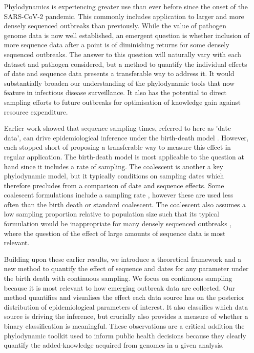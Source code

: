 \documentclass{article}
\begin{document}
Phylodynamics is experiencing greater use than ever before since the onset of the SARS-CoV-2 pandemic. This commonly includes application to larger and more densely sequenced outbreaks than previously. While the value of pathogen genome data is now well established, an emergent question is whether inclusion of more sequence data after a point is of diminishing returns for some densely sequenced outbreaks. The answer to this question will  naturally vary with each dataset and pathogen considered, but a method to quantify the individual effects of date and sequence data presents a transferable way to address it. It would substantially broaden our understanding of the phylodynamic tools that now feature in infectious disease surveillance. It also has the potential to direct sampling efforts to future outbreaks for optimisation of knowledge gain against resource expenditure. 

Earlier work showed that sequence sampling times, referred to here as 'date data', can drive epidemiological inference under the birth-death model \citep{volz_sampling_2014, boskova2018influence, Featherstone2021Infectious}. However, each stopped short of proposing a transferable way to measure this effect in regular application. The birth-death model is most applicable to the question at hand since it includes a rate of sampling. The coalescent is another a key phylodynamic model, but it typically conditions on sampling dates which therefore precludes from a comparison of date and sequence effects. Some coalescent formulations include a sampling rate \citep{volz_sampling_2014}, however these are used less often than the birth death or standard coalescent. The coalescent also assumes a low sampling proportion relative to population size such that its typical formulation would be inappropriate for many densely sequenced outbreaks \citep{boskova2018influence}, where the question of the effect of large amounts of sequence data is most relevant.

Building upon these earlier results, we introduce a theoretical framework and a new method to quantify the effect of sequence and dates for any parameter under the birth death with continuous sampling. We focus on continuous sampling because it is most relevant to how emerging outbreak data are collected. Our method quantifies and visualises the effect each data source has on the posterior distribution of epidemiological parameters of interest. It also classifies which data source is driving the inference, but crucially also provides a measure of  whether  a binary classification is meaningful. These observations are a critical addition the phylodynamic toolkit used to inform public health decisions because they clearly quantify the added-knowledge acquired from genomes in a given analysis.
\end{document}
